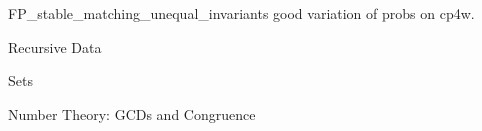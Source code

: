 \documentclass[quiz]{mcs}
\begin{document}


\begin{staffnotes}
FP\_stable\_matching\_unequal\_invariants good variation of probs on cp4w.
\end{staffnotes}

\begin{staffnotes}
\begin{center}
{\large Recursive Data}
\end{center}
\end{staffnotes}






\begin{staffnotes}
\begin{center}
{\large Sets}
\end{center}
\end{staffnotes}


%
%
%
%


\begin{staffnotes}
\begin{center}
{\large Number Theory: GCDs and Congruence}
\end{center}
\end{staffnotes}
\end{document}
